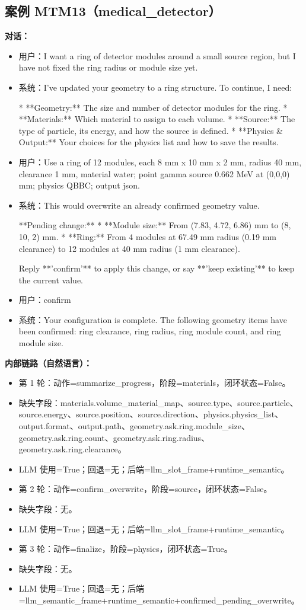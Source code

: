 \documentclass[11pt]{ctexart}
\begin{document}
\subsection{案例 MTM13（medical\_detector）}
\textbf{对话：}
\begin{itemize}
\item 用户：I want a ring of detector modules around a small source region, but I have not fixed the ring radius or module size yet.
\item 系统：I've updated your geometry to a ring structure. To continue, I need:

*   **Geometry:** The size and number of detector modules for the ring.
*   **Materials:** Which material to assign to each volume.
*   **Source:** The type of particle, its energy, and how the source is defined.
*   **Physics \& Output:** Your choices for the physics list and how to save the results.
\item 用户：Use a ring of 12 modules, each 8 mm x 10 mm x 2 mm, radius 40 mm, clearance 1 mm, material water; point gamma source 0.662 MeV at (0,0,0) mm; physics QBBC; output json.
\item 系统：This would overwrite an already confirmed geometry value.

**Pending change:**
*   **Module size:** From (7.83, 4.72, 6.86) mm to (8, 10, 2) mm.
*   **Ring:** From 4 modules at 67.49 mm radius (0.19 mm clearance) to 12 modules at 40 mm radius (1 mm clearance).

Reply **'confirm'** to apply this change, or say **'keep existing'** to keep the current value.
\item 用户：confirm
\item 系统：Your configuration is complete. The following geometry items have been confirmed: ring clearance, ring radius, ring module count, and ring module size.
\end{itemize}
\textbf{内部链路（自然语言）：}
\begin{itemize}
\item 第 1 轮：动作=summarize\_progress，阶段=materials，闭环状态=False。
\item 缺失字段：materials.volume\_material\_map、source.type、source.particle、source.energy、source.position、source.direction、physics.physics\_list、output.format、output.path、geometry.ask.ring.module\_size、geometry.ask.ring.count、geometry.ask.ring.radius、geometry.ask.ring.clearance。
\item LLM 使用=True；回退=无；后端=llm\_slot\_frame+runtime\_semantic。
\item 第 2 轮：动作=confirm\_overwrite，阶段=source，闭环状态=False。
\item 缺失字段：无。
\item LLM 使用=True；回退=无；后端=llm\_slot\_frame+runtime\_semantic。
\item 第 3 轮：动作=finalize，阶段=physics，闭环状态=True。
\item 缺失字段：无。
\item LLM 使用=True；回退=无；后端=llm\_semantic\_frame+runtime\_semantic+confirmed\_pending\_overwrite。
\end{itemize}
\end{document}
